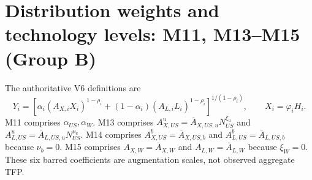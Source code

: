 \clearpage
\section{Distribution weights and technology levels: M11, M13--M15 (Group B)}

The authoritative V6 definitions are
\[
Y_i=\left[\alpha_i(A_{X,i}X_i)^{1-\rho_i}
 +(1-\alpha_i)(A_{L,i}L_i)^{1-\rho_i}\right]^{1/(1-\rho_i)},
\qquad X_i=\varphi_iH_i .
\]
M11 comprises $\alpha_{US},\alpha_W$. M13 comprises
$A^u_{X,US}=\bar A_{X,US,u}N_{US}^{\xi_u}$ and
$A^u_{L,US}=\bar A_{L,US,u}N_{US}^{\nu_u}$.
M14 comprises $A^b_{X,US}=\bar A_{X,US,b}$ and
$A^b_{L,US}=\bar A_{L,US,b}$ because $\nu_b=0$.
M15 comprises $A_{X,W}=\bar A_{X,W}$ and $A_{L,W}=\bar A_{L,W}$ because $\xi_W=0$.
These six barred coefficients are augmentation scales, not observed aggregate TFP.

